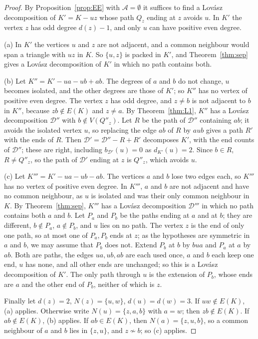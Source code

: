 \documentclass[11pt]{amsart}
\theoremstyle{definition}
\newcommand{\cA}{\mathcal A}
\newcommand{\cD}{\mathcal D}
\begin{document}
\begin{proof}
By Proposition~\ref{prop:EE} with $\cA=\emptyset$ it suffices to find a Lov\'asz decomposition of $K'=K-uz$
whose path $Q_z$ ending at $z$ avoids $u$. In $K'$ the vertex $z$ has odd degree $d(z)-1$, and only $u$ can
have positive even degree.

(a) In $K'$ the vertices $u$ and $z$ are not adjacent, and a common neighbour would span a triangle with
$uz$ in $K$. So $\{u,z\}$ is packed in $K'$, and Theorem~\ref{thm:sep} gives a Lov\'asz decomposition of
$K'$ in which no path contains both.

(b) Let $K''=K'-ua-ub+ab$. The degrees of $a$ and $b$ do not change, $u$ becomes isolated, and the other
degrees are those of $K'$; so $K''$ has no vertex of positive even degree. The vertex $z$ has odd degree,
and $z\ne b$ is not adjacent to $b$ in $K''$, because $zb\notin E(K)$ and $z\ne a$. By Theorem~\ref{thm:L1}, $K''$ has a
Lov\'asz decomposition $\cD''$ with $b\notin V(Q''_z)$. Let $R$ be the path of $\cD''$ containing $ab$; it
avoids the isolated vertex $u$, so replacing the edge $ab$ of $R$ by $aub$ gives a path $R'$ with the
ends of $R$. Then $\cD'=\cD''-R+R'$ decomposes $K'$, with the end counts of $\cD''$; these are right,
including $b_{\cD'}(u)=0$ as $d_{K'}(u)=2$. Since $b\in R$, $R\ne Q''_z$, so the path of $\cD'$ ending at
$z$ is $Q''_z$, which avoids $u$.

(c) Let $K'''=K'-ua-ub-ab$. The vertices $a$ and $b$ lose two edges each, so $K'''$ has no vertex of
positive even degree. In $K'''$, $a$ and $b$ are not adjacent and have no common neighbour, as $u$ is
isolated and was their only common neighbour in $K$. By Theorem~\ref{thm:sep}, $K'''$ has a Lov\'asz
decomposition $\cD'''$ in which no path contains both $a$ and $b$. Let $P_a$ and $P_b$ be the paths ending
at $a$ and at $b$; they are different, $b\notin P_a$, $a\notin P_b$, and $u$ lies on no path. The vertex
$z$ is the end of only one path, so at most one of $P_a,P_b$ ends at $z$; as the hypotheses are symmetric in
$a$ and $b$, we may assume that $P_b$ does not. Extend $P_b$ at $b$ by $bua$ and $P_a$ at $a$ by $ab$. Both
are paths, the edges $ua,ub,ab$ are each used once, $a$ and $b$ each keep one end, $u$ has none, and all
other ends are unchanged; so this is a Lov\'asz decomposition of $K'$. The only path through $u$ is the
extension of $P_b$, whose ends are $a$ and the other end of $P_b$, neither of which is $z$.

Finally let $d(z)=2$, $N(z)=\{u,w\}$, $d(u)=d(w)=3$. If $uw\notin E(K)$, (a) applies. Otherwise write
$N(u)=\{z,a,b\}$ with $a=w$; then $zb\notin E(K)$. If $ab\notin E(K)$, (b) applies. If $ab\in E(K)$, then
$N(a)=\{z,u,b\}$, so a common neighbour of $a$ and $b$ lies in $\{z,u\}$, and $z\not\sim b$; so (c)
applies.
\end{proof}
\end{document}
